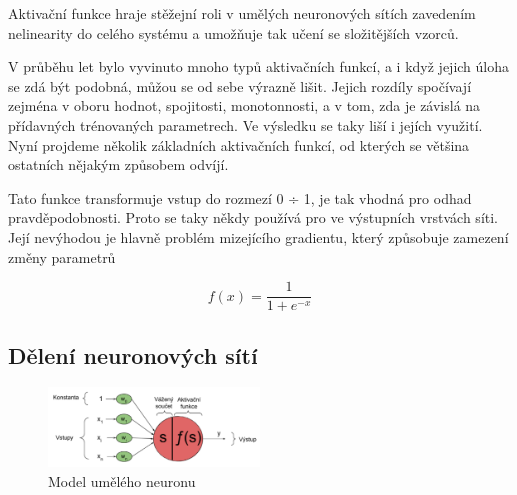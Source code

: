 Aktivační funkce hraje stěžejní roli v umělých neuronových sítích zavedením
nelinearity do celého systému a umožňuje tak učení se složitějších vzorců.

V průběhu let bylo vyvinuto mnoho typů aktivačních funkcí, a i když jejich
úloha se zdá být podobná, můžou se od sebe výrazně lišit. Jejich rozdíly
spočívají zejména v oboru hodnot, spojitosti, monotonnosti, a v tom, zda je
závislá na přídavných trénovaných parametrech. Ve výsledku se taky liší i
jejích využití. Nyní projdeme několik základních aktivačních funkcí, od kterých
se většina ostatních nějakým způsobem odvíjí.


Tato funkce transformuje vstup do rozmezí 0 ÷ 1, je tak vhodná pro odhad
pravděpodobnosti. Proto se taky někdy používá pro ve výstupních vrstvách síti.
Její nevýhodou je hlavně problém mizejícího gradientu, který způsobuje zamezení změny parametrů 

\begin{equation}
    f(x)= \frac{1}{1+e^{-x}}
\end{equation}

\subsection{Dělení neuronových sítí}

\begin{figure}[]
    \centering
    \includegraphics[width=0.5\textwidth]{Figures/neuron.png}
    \caption{Model umělého neuronu \cite{lagan}}
    \label{fig:neuron}
\end{figure}

\endinput